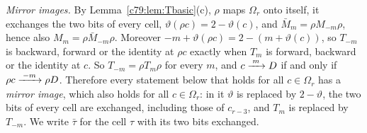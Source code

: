 \emph{Mirror images.} By Lemma~\ref{c79:lem:Tbasic}(c), $\rho$ maps $\Omega_r$ onto itself, it exchanges the two bits of every cell, $\vartheta(\rho c)=2-\vartheta(c)$, and $\bar M_m=\rho M_{-m}\rho$, hence also $M_m=\rho\bar M_{-m}\rho$. Moreover $-m+\vartheta(\rho c)=2-(m+\vartheta(c))$, so $T_{-m}$ is backward, forward or the identity at $\rho c$ exactly when $T_m$ is forward, backward or the identity at $c$. So $T_{-m}=\rho T_m\rho$ for every $m$, and $c\xrightarrow{\;m\;}D$ if and only if $\rho c\xrightarrow{\;-m\;}\rho D$. Therefore every statement below that holds for all $c\in\Omega_r$ has a \emph{mirror image}, which also holds for all $c\in\Omega_r$: in it $\vartheta$ is replaced by $2-\vartheta$, the two bits of every cell are exchanged, including those of $c_{r-3}$, and $T_m$ is replaced by $T_{-m}$. We write $\bar\tau$ for the cell $\tau$ with its two bits exchanged.

